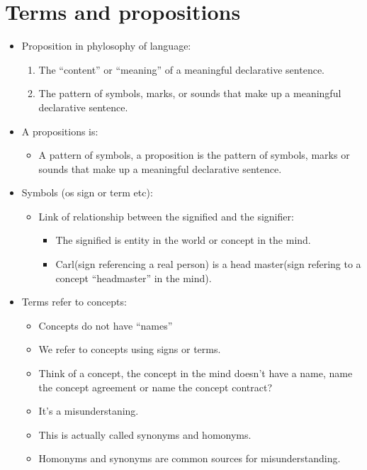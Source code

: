 \section{Terms and propositions}
\begin{itemize}
    \item Proposition in phylosophy of language:  
        \begin{enumerate}
            \item The ``content'' or ``meaning'' of a meaningful declarative sentence.
            \item The pattern of symbols, marks, or sounds that make up a meaningful declarative sentence.
        \end{enumerate}

    \item A propositions is: 
        \begin{itemize}
            \item A pattern of symbols, a proposition is the pattern of symbols, marks or sounds that make up a meaningful declarative sentence.
        \end{itemize}
    
    \item Symbols (os sign or term etc):
        \begin{itemize}
            \item Link of relationship between the signified and the signifier:
                \begin{itemize}
                    \item The signified is entity in the world or concept in the mind.
                    \item Carl(sign referencing a real person) is a head master(sign refering to a concept ``headmaster'' in the mind).
                \end{itemize}
        \end{itemize}
    
    \item Terms refer to concepts:
        \begin{itemize}
            \item Concepts do not have ``names''
            \item We refer to concepts using signs or terms.
            \item Think of a concept, the concept in the mind doesn't have a name, name the concept agreement or name the concept contract? 
            \item It's a misunderstaning.
            \item This is actually called synonyms and homonyms.
            \item Homonyms and synonyms are common sources for misunderstanding.
        \end{itemize}
\end{itemize}



